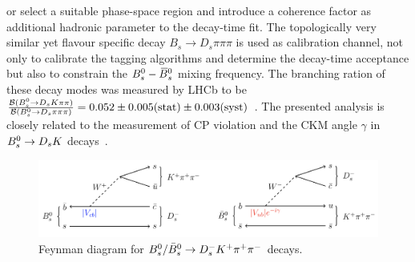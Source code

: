 or select a suitable phase-space region and introduce a coherence factor as additional hadronic parameter to the decay-time fit.
The topologically very similar yet flavour specific decay $B_s \to D_s \pi\pi\pi$ is used as calibration channel,
not only to calibrate the tagging algorithms and determine the decay-time acceptance but also to constrain the ${{B}^0_{s}}-{{\kern 0.18em\overline{\kern -0.18em B}{}}{}^0_{s}}$ mixing frequency.
The branching ration of these decay modes was measured by LHCb to be 
$\frac{\mathcal B({{B}^0_{s}}\rightarrow{\ensuremath{{D}_{s}}}{\ensuremath{K}}\pi\pi)}{\mathcal B({{B}^0_{s}}\rightarrow{\ensuremath{{D}_{s}}}{\ensuremath{\pi}}\pi\pi)} = 0.052 \pm 0.005 (\text{stat}) \pm 0.003 (\text{syst})$~\cite{Blusk:1471393,Blusk:2012it}.\newline
The presented analysis is closely related to the measurement of CP violation and the CKM angle $\gamma$ in ${{B}^0_{s}}\rightarrow{\ensuremath{{D}_{s}}}{\ensuremath{K}}$ decays~\cite{Battista:2196464,Aaij:2017lff}.





\begin{figure}[h]
\centering
\includegraphics[height=!,width=\textwidth]{figs/feynman.png}
\caption{Feynman diagram for $B_s^0/\bar B_s^0 \rightarrow D_s^- K^+ {{\pi}^+} {{\pi}^-}$ decays.}
\label{fig:decay_feynman}
\end{figure}


